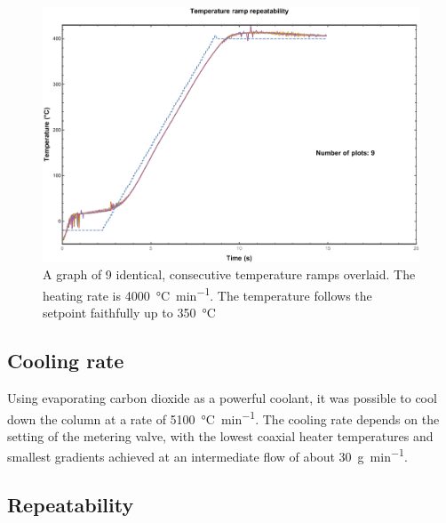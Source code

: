 \documentclass[aip,rsi,preprint,graphicx]{revtex4-1} %
\begin{document}
\begin{figure}
\includegraphics[width=\textwidth]{./Figures/high_rate_heating.pdf}%

\caption{\label{fig:MaxHeatingRate}A graph of 9 identical, consecutive
temperature ramps overlaid. The heating rate is \SI{4000}{\celsius\per\minute}.
The temperature follows the setpoint faithfully up to \SI{350}{\celsius}}

\end{figure}

\subsection{Cooling rate}

Using evaporating carbon dioxide as a powerful coolant, it was possible to cool
down the column at a rate of \SI{5100}{\celsius\per\minute}. The cooling rate
depends on the setting of the metering valve, with the lowest coaxial heater
temperatures and smallest gradients achieved at an intermediate flow of about
\SI{30}{\gram\per\minute}.


\subsection{Repeatability}
\end{document}
